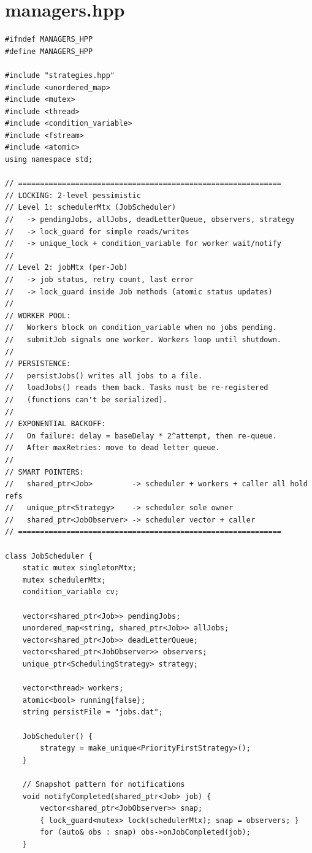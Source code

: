 \documentclass[11pt,a4paper]{article}
\begin{document}
\section{managers.hpp}
\begin{lstlisting}[title={\texttt{managers.hpp}}]
#ifndef MANAGERS_HPP
#define MANAGERS_HPP

#include "strategies.hpp"
#include <unordered_map>
#include <mutex>
#include <thread>
#include <condition_variable>
#include <fstream>
#include <atomic>
using namespace std;

// ============================================================
// LOCKING: 2-level pessimistic
// Level 1: schedulerMtx (JobScheduler)
//   -> pendingJobs, allJobs, deadLetterQueue, observers, strategy
//   -> lock_guard for simple reads/writes
//   -> unique_lock + condition_variable for worker wait/notify
//
// Level 2: jobMtx (per-Job)
//   -> job status, retry count, last error
//   -> lock_guard inside Job methods (atomic status updates)
//
// WORKER POOL:
//   Workers block on condition_variable when no jobs pending.
//   submitJob signals one worker. Workers loop until shutdown.
//
// PERSISTENCE:
//   persistJobs() writes all jobs to a file.
//   loadJobs() reads them back. Tasks must be re-registered
//   (functions can't be serialized).
//
// EXPONENTIAL BACKOFF:
//   On failure: delay = baseDelay * 2^attempt, then re-queue.
//   After maxRetries: move to dead letter queue.
//
// SMART POINTERS:
//   shared_ptr<Job>         -> scheduler + workers + caller all hold refs
//   unique_ptr<Strategy>    -> scheduler sole owner
//   shared_ptr<JobObserver> -> scheduler vector + caller
// ============================================================

class JobScheduler {
    static mutex singletonMtx;
    mutex schedulerMtx;
    condition_variable cv;

    vector<shared_ptr<Job>> pendingJobs;
    unordered_map<string, shared_ptr<Job>> allJobs;
    vector<shared_ptr<Job>> deadLetterQueue;
    vector<shared_ptr<JobObserver>> observers;
    unique_ptr<SchedulingStrategy> strategy;

    vector<thread> workers;
    atomic<bool> running{false};
    string persistFile = "jobs.dat";

    JobScheduler() {
        strategy = make_unique<PriorityFirstStrategy>();
    }

    // Snapshot pattern for notifications
    void notifyCompleted(shared_ptr<Job> job) {
        vector<shared_ptr<JobObserver>> snap;
        { lock_guard<mutex> lock(schedulerMtx); snap = observers; }
        for (auto& obs : snap) obs->onJobCompleted(job);
    }


\end{lstlisting}
\end{document}
